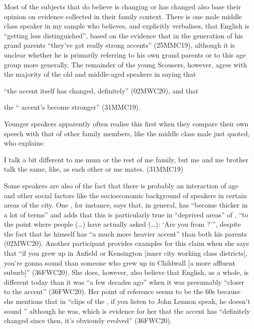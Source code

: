 Most of the subjects that do believe  is changing or has changed also base their opinion on evidence collected in their family context.
There is one male middle class speaker in my sample who believes, and explicitly verbalises, that  English is ``getting less distinguished'', based on the evidence that in the generation of his grand parents ``they've got really strong accents'' (25MMC19), although it is unclear whether he is primarily referring to his own grand parents or to this age group more generally.
The remainder of the young Scousers, however, agree with the majority of the old and middle-aged speakers in saying that
\begin{inparaenum}[(a)]
	\item ``the accent itself has changed, definitely'' (02MWC20), and that
	\item the `` accent's become stronger'' (31MMC19).
\end{inparaenum}
Younger speakers apparently often realise this first when they compare their own speech with that of other family members, like the middle class male just quoted, who explains:
\begin{example}
	I talk a bit different to me mum or the rest of me family, but me and me brother talk the same, like, as each other or me mates. (31MMC19)
\end{example}

Some speakers are also  of the fact that there is probably an interaction of age and other social factors like the socioeconomic background of speakers in certain areas of the city.
One , for instance, says that, in general,  has ``become thicker in a lot of terms'' and adds that this is particularly true in ``deprived areas'' of , ``to the point where people (\ldots) have actually asked (\ldots): `Are you from ?''', despite the fact that he himself has ``a much more heavier accent'' than both his parents (02MWC20).
Another participant provides examples for this claim when she says that ``if you grew up in Anfield or Kensington [inner city working class districts], you're gonna sound  than someone who grew up in Childwall [a more affluent suburb]'' (36FWC20).
She does, however, also believe that  English, as a whole, is different today than it was ``a few decades ago'' when it was presumably ``closer to the  accent'' (36FWC20).
Her point of reference seems to be the 60s because she mentions that in ``clips of the , if you listen to John Lennon speak, he doesn't sound '' although he was, which is evidence for her that the accent has ``definitely changed since then, it's obviously evolved'' (36FWC20).

